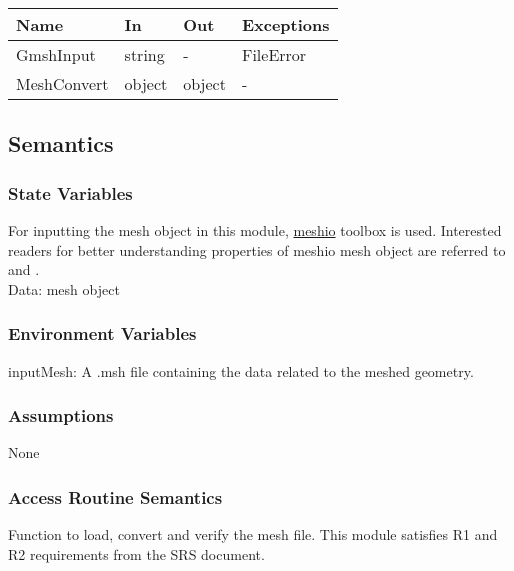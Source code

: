 \documentclass[12pt, titlepage]{article}
\begin{document}
\begin{center}
	\begin{tabular}{p{4cm} p{2cm} p{2cm} p{2cm}}
		\hline
		\textbf{Name} & \textbf{In} & \textbf{Out} & \textbf{Exceptions} \\
		\hline
		GmshInput & string & - & FileError \\
		MeshConvert & object & object & -\\
		\hline
	\end{tabular}
\end{center}

\subsection{Semantics}

\subsubsection{State Variables}

For inputting the mesh object in this module, \hyperref{https://pypi.org/project/meshio/}{library}{}{meshio} toolbox is used. Interested readers for better understanding properties of meshio mesh object are referred to \cite{schlomer2019meshio} and \cite{dai2017high}. \\

Data: mesh object

\subsubsection{Environment Variables}
inputMesh: A .msh file containing the data related to the meshed geometry.

\subsubsection{Assumptions}

None

\subsubsection{Access Routine Semantics}

Function to load, convert and verify the mesh file. This module satisfies R1 and R2 requirements from the SRS document.
\end{document}
